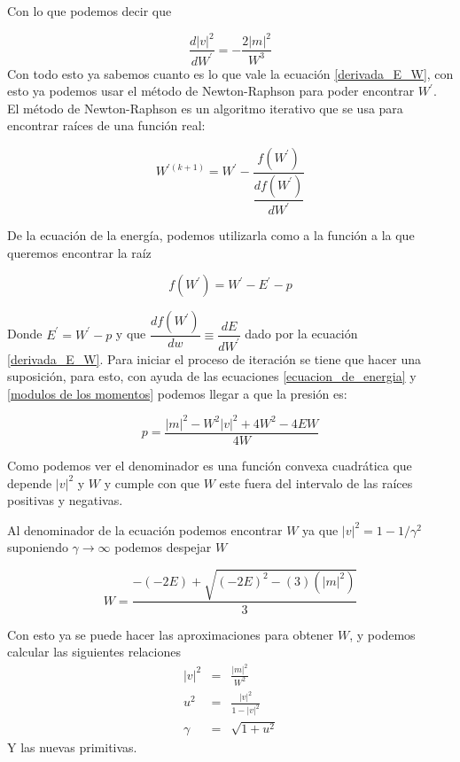 \documentclass[12pt,a4paper]{book}
\providecommand{\abs}[1]{\lvert#1\rvert} %
\begin{document}
Con lo que podemos decir que 

\begin{equation}\label{der_v2}
\dfrac{d\abs{v}^2}{d W^{'} }=-\frac{2 \abs{m}^{2}}{W^{3}}
\end{equation}
Con todo esto ya sabemos cuanto es lo que vale la ecuación \ref{derivada_E_W}, con esto ya podemos usar el método de Newton-Raphson para poder encontrar $W^{'}$.\\

El método de Newton-Raphson es un algoritmo iterativo que se usa para encontrar raíces  de una función real:

\begin{equation}
W^{'(k+1)}=W^{'}-\frac{f(W^{'})}{\dfrac{d f(W^{'})}{d W^{'}}}
\end{equation}

De la ecuación de la energía, podemos utilizarla como a la función a la que queremos encontrar la raíz

\begin{equation} \label{ecuación_f}
f(W^{'})=W^{'}-E^{'}-p
\end{equation}

Donde $E^{'}=W^{'}-p$ y que $\dfrac{d f(W^{'})}{d w} \equiv \dfrac{dE}{dW^{'}}$ dado por la ecuación \ref{derivada_E_W}. Para iniciar el proceso de iteración se tiene que hacer una suposición, para esto, con ayuda de las ecuaciones \ref{ecuacion_de_energia} y \ref{modulos de los momentos} podemos llegar a que la presión es:

\begin{equation} \label{presion_de_newton}
p=\frac{\abs{m}^{2}-W^{2}\abs{v}^{2}+4W^{2}-4EW}{4W}
\end{equation}

Como podemos ver el denominador es una función convexa cuadrática que depende $\abs{v}^{2}$ y $W$ y cumple con que $W$ este fuera del intervalo de las raíces positivas y negativas.

Al denominador de la  ecuación podemos encontrar $W$ ya que $\abs{v}^{2}=1-1/\gamma^{2}$ suponiendo $\gamma \rightarrow \infty$ podemos despejar $W$

\begin{equation}\label{suposicion_de_W}
W=\frac{-(-2E)+\sqrt{(-2E)^{2}-(3)(\abs{m}^{2})}}{3}
\end{equation}

Con esto ya se puede hacer las aproximaciones para obtener $W$, y podemos calcular las siguientes relaciones 
\begin{eqnarray}
\abs{v}^{2} &=& \frac{\abs{m}^{2}}{W^{2}}\label{prim_v2}\\ 
u^{2}&=&\frac{\abs{v}^{2}}{1-\abs{v}^{2}}\label{u2}\\
\gamma &=& \sqrt{1+u^{2}}
\end{eqnarray}
Y las nuevas primitivas.\\
\end{document}
